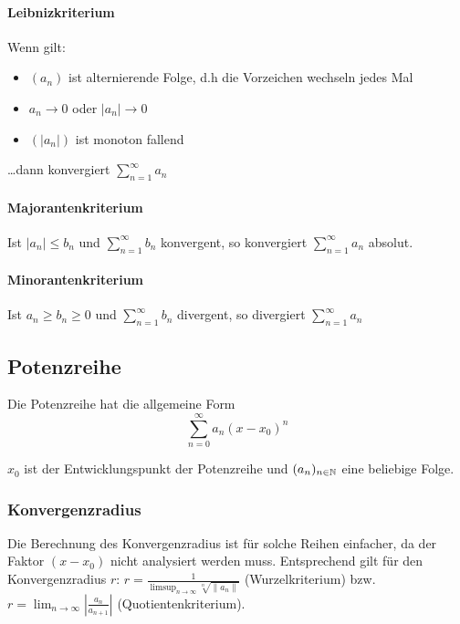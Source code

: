 \paragraph{Leibnizkriterium}
Wenn gilt:
\begin{itemize}
	\item $(a_n)$ ist alternierende Folge, d.h die Vorzeichen wechseln jedes Mal
	\item $a_n \to 0$ oder $|a_n| \to 0$
	\item $(|a_n|)$ ist monoton fallend
\end{itemize}
\ldots dann konvergiert $\sum_{n=1}^\infty a_n$

\paragraph{Majorantenkriterium}
Ist $|a_n| \leq b_n$ und $\sum_{n=1}^\infty b_n$ konvergent, so konvergiert
$\sum_{n=1}^\infty a_n$ absolut.

\paragraph{Minorantenkriterium}
Ist $a_n \geq b_n \geq 0$ und $\sum_{n=1}^\infty b_n$ divergent, so divergiert
$\sum_{n=1}^\infty a_n$

\subsection{Potenzreihe}
Die Potenzreihe hat die allgemeine Form
\[
\sum_{n=0}^\infty a_n (x - x_0)^n
\]

$x_0$ ist der Entwicklungspunkt der Potenzreihe und $(a_n)_{n \in \mathbb{N}}$ eine
beliebige Folge.

\subsubsection{Konvergenzradius}
Die Berechnung des Konvergenzradius ist für solche Reihen einfacher, da der
Faktor $(x - x_0)$ nicht analysiert werden muss. Entsprechend gilt für den
Konvergenzradius $r$:
$r = \frac{1}{\limsup_{n\to\infty} \sqrt[n]{\|a_n\|}}$ (Wurzelkriterium) bzw.
$r = \lim_{n\to\infty} \left | \frac{a_n}{a_{n+1}} \right |$
(Quotientenkriterium).

